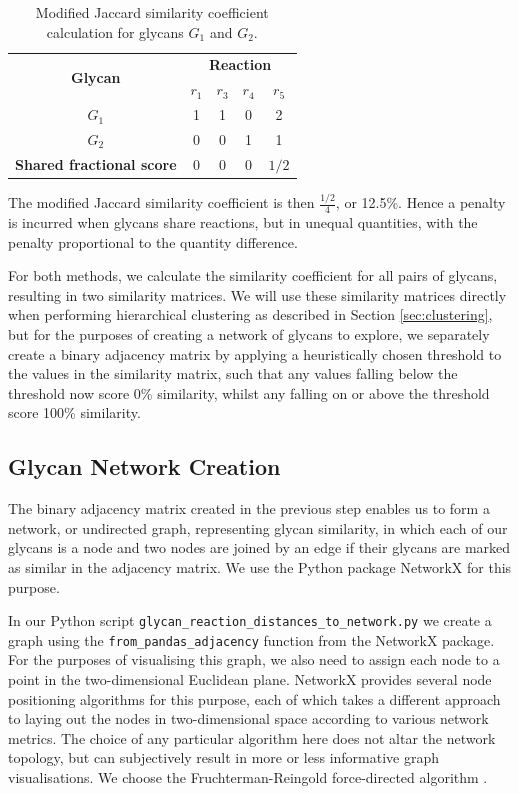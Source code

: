 \documentclass[12pt,a4paper]{article}
\begin{document}
\begin{table}[h]
\centering
\begin{tabular}{|c|c|c|c|c|} \hline
\multirow{2}{*}{\bf Glycan} & \multicolumn{4}{|c|}{\bf Reaction}\\  \cline{2-5}
& {\bf $r_1$} & {\bf $r_3$} & {\bf $r_4$} & {\bf $r_5$} \\ \hline
$G_1$ & 1 & 1 & 0 & 2 \\ \hline
$G_2$ & 0 & 0 & 1 & 1 \\ \hline
{\bf Shared fractional score} & 0 & 0 & 0 & $1/2$ \\ \hline
\end{tabular}
\caption{Modified Jaccard similarity coefficient calculation for glycans $G_1$ and $G_2$.}
\label{tab:jaccard_list_example}
\end{table}

The modified Jaccard similarity coefficient is then $\frac{1/2}{4}$, or 12.5\%. Hence a penalty is incurred when glycans share reactions, but in unequal quantities, with the penalty proportional to the quantity difference.

For both methods, we calculate the similarity coefficient for all pairs of glycans, resulting in two similarity matrices. We will use these similarity matrices directly when performing hierarchical clustering as described in Section \ref{sec:clustering}, but for the purposes of creating a network of glycans to explore, we separately create a binary adjacency matrix by applying a heuristically chosen threshold to the values in the similarity matrix, such that any values falling below the threshold now score 0\% similarity, whilst any falling on or above the threshold score 100\% similarity.


\subsection{Glycan Network Creation}
\label{sec:network_creation}

The binary adjacency matrix created in the previous step enables us to form a network, or undirected graph, representing glycan similarity, in which each of our glycans is a node and two nodes are joined by an edge if their glycans are marked as similar in the adjacency matrix. We use the Python package NetworkX \citep{hagberg2008exploring} for this purpose.

In our Python script \texttt{glycan\_reaction\_distances\_to\_network.py} we create a graph using the \texttt{from\_pandas\_adjacency} function from the NetworkX package. For the purposes of visualising this graph, we also need to assign each node to a point in the two-dimensional Euclidean plane. NetworkX provides several node positioning algorithms for this purpose, each of which takes a different approach to laying out the nodes in two-dimensional space according to various network metrics. The choice of any particular algorithm here does not altar the network topology, but can subjectively result in more or less informative graph visualisations. We choose the Fruchterman-Reingold force-directed algorithm \citep{fruchterman1991graph}.
\end{document}
